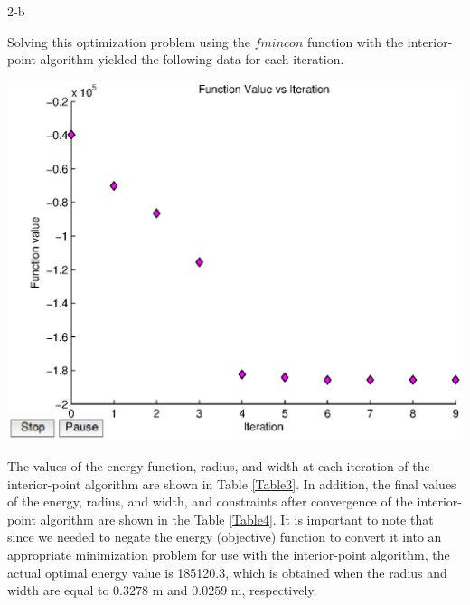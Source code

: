 \documentclass[11pt]{article}
\begin{document}
\begin{problem}{2-b}
\end{problem}
\begin{solution}
Solving this optimization problem using the $fmincon$ function with the interior-point algorithm yielded the following data for each iteration.

\begin{center}
\includegraphics[scale=0.75]{problem2/problem2.eps}
\end{center}

The values of the energy function, radius, and width at each iteration of the interior-point algorithm are shown in Table \ref{Table3}. In addition, the final values of the energy, radius, and width, and constraints after convergence of the interior-point algorithm are shown in the Table \ref{Table4}. It is important to note that since we needed to negate the energy (objective) function to convert it into an appropriate minimization problem for use with the interior-point algorithm, the actual optimal energy value is 185120.3, which is obtained when the radius and width are equal to $0.3278$ m and $0.0259$ m, respectively. 


\end{solution}
\end{document}
